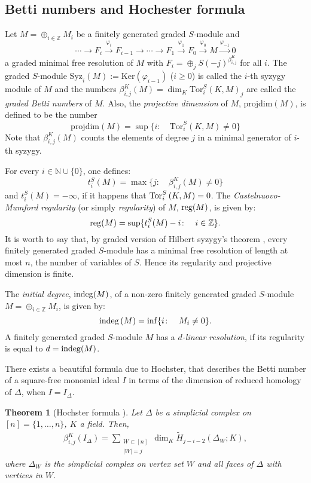 \documentclass[a4paper,11pt]{amsart}
\theoremstyle{plain}
\newtheorem{thm}{Theorem}[section]
\theoremstyle{definition}
\theoremstyle{remark}
\begin{document}
\subsection*{Betti numbers and Hochester formula}
Let $M = \oplus_{i\in {{\mathbb Z}}}M_i$ be a finitely generated graded $S$-module and
$$
 \cdots \to F_i \stackrel{\varphi_i}{\longrightarrow} F_{i-1} \to \cdots \to F_1 \stackrel{\varphi_1}{\longrightarrow} F_0 \stackrel{\varphi_0}{\longrightarrow} M \stackrel{\varphi_{-1}}{\longrightarrow} 0
$$
a graded minimal free resolution of $M$ with $F_i = \oplus_j S(-j)^{\beta^K_{i,j}}$ for all $i$. The graded $S$-module $\mathrm{Syz}_i (M) :=\mathrm{Ker} (\varphi_{i-1})$ ($i \geq 0$) is called the $i$-th syzygy module of $M$ and the numbers $\beta_{i,j}^K(M) = \dim_K \mbox{Tor}^S_i(K,M)_j$ are called the \textit{graded Betti numbers} of $M$. Also, the \textit{projective dimension} of $M$,  $\mbox{projdim}(M)$, is defined to be the number
$$
\mbox{projdim}(M) = \sup\{i \colon \quad \mbox{Tor}^S_i(K,M) \neq 0\}
$$
Note that $\beta^K_{i,j}(M)$ counts the elements of degree $j$ in a minimal generator of $i$-th syzygy.

For every $i \in \mathbb{N} \cup \{0\}$, one defines:
$$t^S_i(M) = \max \{j \colon \quad \beta^K_{i,j}(M) \neq 0 \}$$
and $t^S_i(M)= - \infty$, if it happens that ${{\rm Tor}_{{i}}^{{S}}\,({{K}},{{M}})}= 0$. The \textit{Castelnuovo-Mumford regularity} (or simply \textit{regularity}) of $M$, ${{\rm reg}}(M)$, is given by:
$${{\rm reg}} (M)= \sup \{t^S_i(M)-i \colon \quad i \in {{\mathbb Z}} \}.$$
It is worth to say that, by graded version of Hilbert syzygy's theorem \cite[Corollary 19.7]{Eisenbud}, every finitely generated graded $S$-module has a minimal free resolution of length at most $n$, the number of variables of $S$. Hence its regularity and projective dimension is finite.

The \textit{initial degree}, ${\rm indeg} (M)$, of a non-zero finitely generated graded $S$-module $M= \oplus_{i\in {{\mathbb Z}}}M_i$, is given by:
$${\rm indeg}\, (M)=\inf \{i \colon \quad M_i \neq 0 \}.$$
A finitely generated graded $S$-module $M$ has a \textit{$d$-linear resolution}, if its regularity is equal to $d = {\rm indeg} (M)$.

There exists a beautiful formula due to Hochster, that describes the Betti number of a square-free monomial ideal $I$ in terms of the dimension of reduced homology of $\Delta$, when $I = I_\Delta$.
\begin{thm}[{Hochster formula \cite[Theorem 5.1]{Hochster}}] \label{Hochster Formula}
Let $\Delta$ be a simplicial complex on $[n] = \{1, \ldots, n\}$, $K$ a field. Then,
\begin{align*}
\beta^K_{i,j}(I_\Delta) = \sum\limits_{\substack{W \subset [n] \\ |W|=j}}{\dim_K \tilde{H}_{j-i-2}(\Delta_W; K)},
\end{align*}
where $\Delta_W$ is the simplicial complex on vertex set $W$ and all faces of $\Delta$ with vertices in $W$.
\end{thm}
\end{document}
